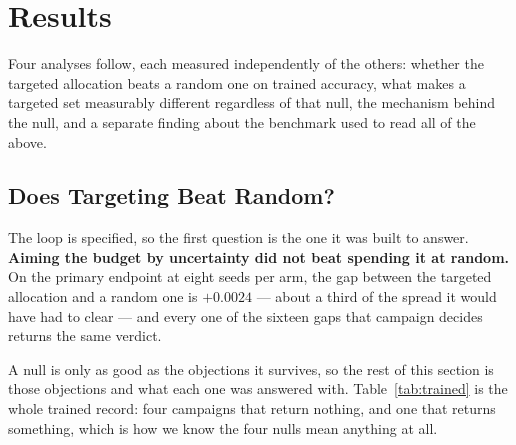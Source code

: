 \documentclass{article}
\begin{document}
\section{Results}
\label{sec:results}
Four analyses follow, each measured independently of the others: whether the targeted allocation
beats a random one on trained accuracy, what makes a targeted set measurably different regardless of
that null, the mechanism behind the null, and a separate finding about the benchmark used to read all
of the above.

\subsection{Does Targeting Beat Random?}
\label{sec:null}
The loop is specified, so the first question is the one it was built to answer. \textbf{Aiming the
budget by uncertainty did not beat spending it at random.} On the primary endpoint at eight seeds
per arm, the gap between the targeted allocation and a random one is $+0.0024$ --- about a third of
the spread it would have had to clear --- and every one of the sixteen gaps that campaign decides
returns the same verdict.

A null is only as good as the objections it survives, so the rest of this section is those
objections and what each one was answered with. Table~\ref{tab:trained} is the whole trained record:
four campaigns that return nothing, and one that returns something, which is how we know the four
nulls mean anything at all.
\end{document}
